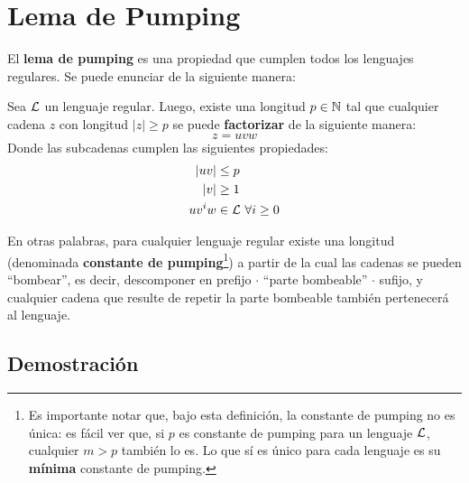 \section{Lema de Pumping}

El \textbf{lema de pumping} es una propiedad que cumplen todos los lenguajes regulares. Se puede enunciar de la siguiente manera:

\begin{theorem*}
    Sea $\mathcal{L}$ un lenguaje regular. Luego, existe una longitud $p \in \mathbb{N}$ tal que cualquier cadena $z$ con longitud $|z| \geq p$ se puede \textbf{factorizar} de la siguiente manera:
    $$
        z = u v w
    $$
    Donde las subcadenas cumplen las siguientes propiedades:
    $$
        \begin{aligned}
            |uv|    & \leq p                    \\
            |v|     & \geq 1                    \\
            u v^i w & \in \mathcal{L} \ \forall i \geq 0
        \end{aligned}
    $$
\end{theorem*}

En otras palabras, para cualquier lenguaje regular existe una longitud (denominada \textbf{constante de pumping}\footnote{Es importante notar que, bajo esta definición, la constante de pumping no es única: es fácil ver que, si $p$ es constante de pumping para un lenguaje $\mathcal{L}$, cualquier $m > p$ también lo es. Lo que sí es único para cada lenguaje es su \textbf{mínima} constante de pumping.}) a partir de la cual las cadenas se pueden ``bombear'', es decir, descomponer en prefijo $\cdot$ ``parte bombeable'' $\cdot$ sufijo, y cualquier cadena que resulte de repetir la parte bombeable también pertenecerá al lenguaje.

\subsection{Demostración}

